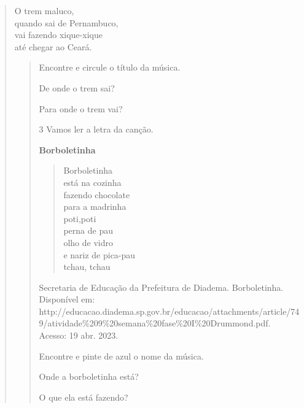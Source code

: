 {{{\begin{escolha}
\begin{escolha}
\begin{verse}
O trem maluco,\\
quando sai de Pernambuco,\\
vai fazendo xique-xique\\
até chegar ao Ceará.
\begin{verse}

\begin{escolha}
\item  Encontre e circule o título da música.

\item De onde o trem sai?


\item Para onde o trem vai?
\end{escolha}


\num{3} Vamos ler a letra da canção.


\textbf{Borboletinha}
\begin{verse}
Borboletinha\\
está na cozinha\\
fazendo chocolate\\
para a madrinha\\
poti,poti\\
perna de pau\\
olho de vidro\\
e nariz de pica-pau\\
tchau, tchau
\end{verse}

Secretaria de Educação da Prefeitura de Diadema. Borboletinha. Disponível em: http://educacao.diadema.sp.gov.br/educacao/attachments/article/749/atividade\%209\%20semana\%20fase\%20I\%20Drummond.pdf. Acesso: 19 abr. 2023. 

\begin{escolha}
\item Encontre e pinte de azul o nome da música.

\item Onde a borboletinha está?


\item O que ela está fazendo?


\end{escolha}
\end{verse}
\end{verse}
\end{escolha}
\end{escolha}}}}
